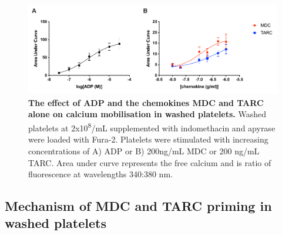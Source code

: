 \documentclass[11pt,twoside]{bristolthesis}
\begin{document}
\begin{figure}

{\centering \includegraphics[width=0.9\linewidth]{figure/Chemokines/Layouts/MDC_TARC_calcium_wp} 

}

\caption[The effect of ADP and the chemokines MDC and TARC alone on calcium mobilisation in washed platelets.]{\textbf{The effect of ADP and the chemokines MDC and TARC alone on calcium mobilisation in washed platelets.} Washed platelets at 2x10\textsuperscript{8}/mL supplemented with indomethacin and apyrase were loaded with Fura-2. Platelets were stimulated with increasing concentrations of A) ADP or B) 200ng/mL MDC or 200 ng/mL TARC. Area under curve represents the free calcium and is ratio of fluorescence at wavelengths 340:380 nm.}\label{fig:MDC-TARC-wp-calcium}
\end{figure}
\hypertarget{mechanism-of-mdc-and-tarc-priming-in-washed-platelets}{%
\subsection{Mechanism of MDC and TARC priming in washed platelets}\label{mechanism-of-mdc-and-tarc-priming-in-washed-platelets}}
\end{document}

